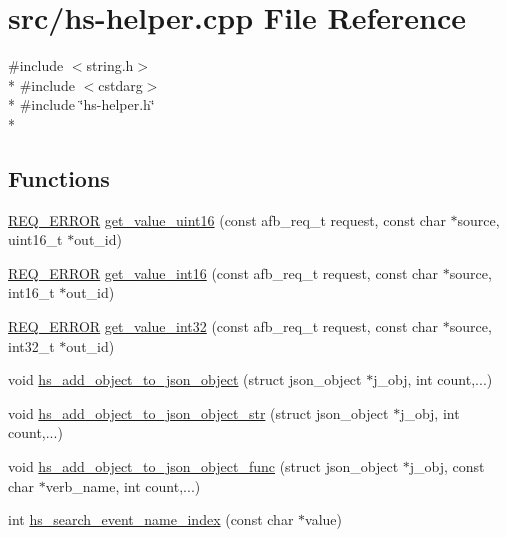 \hypertarget{hs-helper_8cpp}{}\section{src/hs-\/helper.cpp File Reference}
\label{hs-helper_8cpp}
{\ttfamily \#include $<$string.\+h$>$}\\*
{\ttfamily \#include $<$cstdarg$>$}\\*
{\ttfamily \#include \char`\"{}hs-\/helper.\+h\char`\"{}}\\*
\subsection*{Functions}
\begin{DoxyCompactItemize}
\item 
\hyperlink{hs-helper_8h_aa49f1dbbf26f01627a5737cf43aad899}{R\+E\+Q\+\_\+\+E\+R\+R\+OR} \hyperlink{hs-helper_8cpp_aba9ca63f68b1991f8650871f4eae8e0b}{get\+\_\+value\+\_\+uint16} (const afb\+\_\+req\+\_\+t request, const char $\ast$source, uint16\+\_\+t $\ast$out\+\_\+id)
\item 
\hyperlink{hs-helper_8h_aa49f1dbbf26f01627a5737cf43aad899}{R\+E\+Q\+\_\+\+E\+R\+R\+OR} \hyperlink{hs-helper_8cpp_af3043612cf74bb92cb073e10cacd594a}{get\+\_\+value\+\_\+int16} (const afb\+\_\+req\+\_\+t request, const char $\ast$source, int16\+\_\+t $\ast$out\+\_\+id)
\item 
\hyperlink{hs-helper_8h_aa49f1dbbf26f01627a5737cf43aad899}{R\+E\+Q\+\_\+\+E\+R\+R\+OR} \hyperlink{hs-helper_8cpp_a8121d965b6fd795c16b8576ab03dcaf1}{get\+\_\+value\+\_\+int32} (const afb\+\_\+req\+\_\+t request, const char $\ast$source, int32\+\_\+t $\ast$out\+\_\+id)
\item 
void \hyperlink{hs-helper_8cpp_a1ba31a6a94515ff1730ba0043a67d59e}{hs\+\_\+add\+\_\+object\+\_\+to\+\_\+json\+\_\+object} (struct json\+\_\+object $\ast$j\+\_\+obj, int count,...)
\item 
void \hyperlink{hs-helper_8cpp_a8777c53f1d4d5412f19b134ad85ffedf}{hs\+\_\+add\+\_\+object\+\_\+to\+\_\+json\+\_\+object\+\_\+str} (struct json\+\_\+object $\ast$j\+\_\+obj, int count,...)
\item 
void \hyperlink{hs-helper_8cpp_ae83604a37134e7bdee3ce4f10bb0b47a}{hs\+\_\+add\+\_\+object\+\_\+to\+\_\+json\+\_\+object\+\_\+func} (struct json\+\_\+object $\ast$j\+\_\+obj, const char $\ast$verb\+\_\+name, int count,...)
\item 
int \hyperlink{hs-helper_8cpp_a2ff1b894941c3b461ca8119079c4146a}{hs\+\_\+search\+\_\+event\+\_\+name\+\_\+index} (const char $\ast$value)
\end{DoxyCompactItemize}
